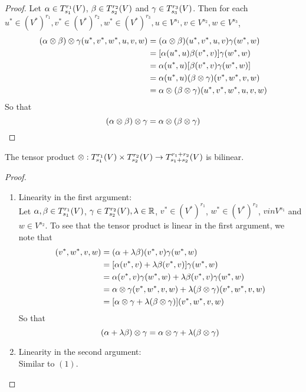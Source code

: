 \documentclass{book}
\begin{document}
	\begin{proof}
	Let $\alpha \in T^{r_{1}}_{s_{1}}(V)$, $\beta \in T^{r_{2}}_{s_{2}}(V)$ and $\gamma \in T^{r_{3}}_{s_{3}}(V)$. Then for each $u^* \in (V^*)^{r_1}, v^* \in (V^*)^{r_2}, w^* \in (V^*)^{r_3}, u \in V^{s_1}, v \in V^{s_2}, w \in V^{s_3}$,  
	\begin{align*}
	(\alpha \otimes \beta) \otimes \gamma (u^*, v^*, w^*, u, v, w) 
	&= (\alpha \otimes \beta) (u^*, v^*, u, v) \gamma (w^*, w) \\
	&= [\alpha(u^*, u) \beta(v^*, v)] \gamma(w^*, w) \\
	&= \alpha(u^*, u) [\beta(v^*, v) \gamma(w^*, w)] \\
	&= \alpha(u^*, u) (\beta \otimes \gamma) (v^*, w^*, v, w) \\
	&= \alpha \otimes (\beta \otimes \gamma)(u^*, v^*, w^*, u, v, w) 
	\end{align*}
	So that $$(\alpha \otimes \beta) \otimes \gamma = \alpha \otimes (\beta \otimes \gamma)$$
\end{proof}		
	
	\begin{ex}
	The tensor product $\otimes : T^{r_{1}}_{s_{1}}(V) \times  T^{r_{2}}_{s_{2}}(V) \rightarrow T^{r_1 + r_2}_{s_1 + s_2}(V)$ is bilinear. 
	\end{ex}
	
	\begin{proof}\
	\begin{enumerate}
	\item Linearity in the first argument:\\
	Let $\alpha, \beta \in T^{r_{1}}_{s_{1}}(V)$, $ \gamma \in T^{r_{2}}_{s_{2}}(V), \lambda \in \mathbb{R}$, $v^* \in (V^*)^{r_1}$, $w^* \in (V^*)^{r_2}$, $v in V^{s_1}$ and $w \in V^{s_2}$. To see that the tensor product is linear in the first argument, we note that  
	\begin{align*}
	[(\al + \lam \be) \otimes \gam] (v^*, w^*, v, w) 
	&= (\al + \lam \be)(v^*, v) \gam(w^*, w) \\
	&= [\al(v^*, v) + \lam \be (v^*, v)] \gam (w^*, w) \\
	&= \al(v^*, v) \gam (w^*, w) + \lam \be (v^*, v) \gam (w^*, w) \\
	&= \al \otimes \gam (v^*, w^*, v, w)  + \lam (\be \otimes \gam) (v^*, w^*, v, w) \\
	&= [\al \otimes \gam + \lam (\be \otimes \gam)] (v^*, w^*, v, w) 
	\end{align*}
	So that $$(\alpha + \lambda \beta) \otimes \gamma = \alpha \otimes \gamma + \lambda (\beta \otimes \gamma)$$
	\item Linearity in the second argument:\\
	Similar to $(1)$.
	\end{enumerate}
\end{proof}			
	
\end{document}
